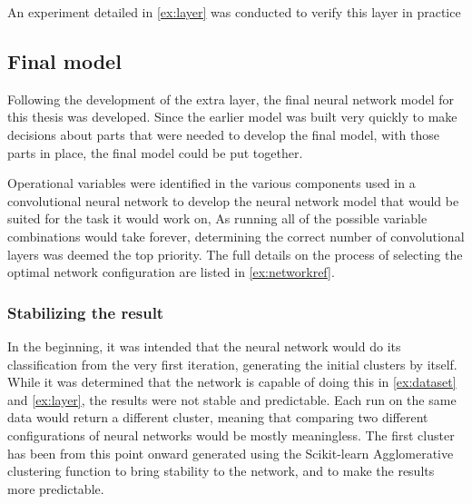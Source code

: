An experiment detailed in \cref{ex:layer} was conducted to verify this layer in practice

\subsection{Final model}
Following the development of the extra layer, the final neural network model for this thesis was developed.
Since the earlier model was built very quickly to make decisions about parts that were needed to develop the final model, with those parts in place, the final model could be put together.

Operational variables were identified in the various components used in a convolutional neural network to develop the neural network model that would be suited for the task it would work on, 
As running all of the possible variable combinations would take forever, determining the correct number of convolutional layers was deemed the top priority.
The full details on the process of selecting the optimal network configuration are listed in \cref{ex:networkref}.

\subsubsection{Stabilizing the result}

In the beginning, it was intended that the neural network would do its classification from the very first iteration, generating the initial clusters by itself.
While it was determined that the network is capable of doing this in \cref{ex:dataset} and \cref{ex:layer}, the results were not stable and predictable.
Each run on the same data would return a different cluster, meaning that comparing two different configurations of neural networks would be mostly meaningless.
The first cluster has been from this point onward generated using the Scikit-learn Agglomerative clustering function to bring stability to the network, and to make the results more predictable.




